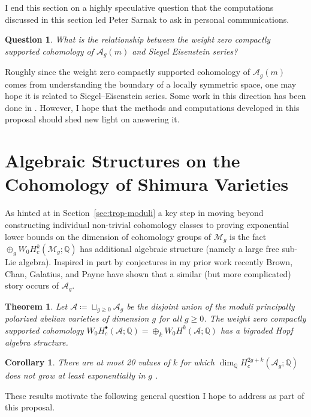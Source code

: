 \documentclass[11pt,reqno]{amsart}
\newtheorem{theorem}[lemma]{Theorem}
\newtheorem{cor}[lemma]{Corollary}
\newtheorem{question}[lemma]{Question}
\theoremstyle{remark}
\newcommand{\QQ}{\mathbb{Q}}
\newcommand{\cA}{\mathcal{A}}
\newcommand{\cM}{\mathcal{M}}
\begin{document}
I end this section on a highly speculative question that the computations discussed in this section led Peter Sarnak to ask in personal communications. 

\begin{question}
What is the relationship between the weight zero compactly supported cohomology of $\cA_{g}(m)$ and Siegel Eisenstein series?
\end{question}

Roughly since the weight zero compactly supported cohomology of $\cA_{g}(m)$ comes from understanding the boundary of a locally symmetric space, one may hope it is related to Siegel–Eisenstein series. Some work in this direction has been done in \cite{harrisZucker,harris14}. However, I hope that the methods and computations developed in this proposal should shed new light on answering it. 


\section{Algebraic Structures on the Cohomology of Shimura Varieties}\label{sec:alg-structure}

As hinted at in Section~\ref{sec:trop-moduli} a key step in moving beyond constructing individual non-trivial cohomology classes to proving exponential lower bounds on the dimension of cohomology groups of $\cM_{g}$ is the fact $\oplus_{g} W_{0}H_{c}^{k}(\cM_{g};\QQ)$ has additional algebraic structure (namely a large free sub-Lie algebra). Inspired in part by conjectures in my prior work \cite{BBCMMW24} recently Brown, Chan, Galatius, and Payne have shown that a similar (but more complicated) story occurs of $\cA_{g}$.

\begin{theorem}\cite[Theorem 1.1]{BCGP24}
Let $\cA\coloneqq \sqcup_{g\geq0}\cA_{g}$ be the disjoint union of the moduli principally polarized abelian varieties of dimension $g$ for all $g\geq0$. The weight zero compactly supported cohomology $W_{0}H^{\bullet}_{c}(\cA;\QQ)=\oplus_{k} W_{0}H^{k}(\cA;\QQ)$ has a bigraded Hopf algebra structure.\end{theorem}

\begin{cor}\cite[Corollary 1.5]{BCGP24}
There are at most 20 values of $k$ for which $\dim_{\QQ} H^{2g+k}_{c}(\cA_{g}; \QQ)$ does not grow at least exponentially in $g$ .
\end{cor}

These results motivate the following general question I hope to address as part of this proposal. 
\end{document}
